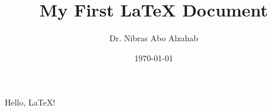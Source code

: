 \documentclass[11pt, a4paper]{article}
\title{My First LaTeX Document}
\author{Dr. Nibras Abo Alzahab}
\date{\today}
\begin{document}
\maketitle

Hello, \LaTeX!
\end{document}
